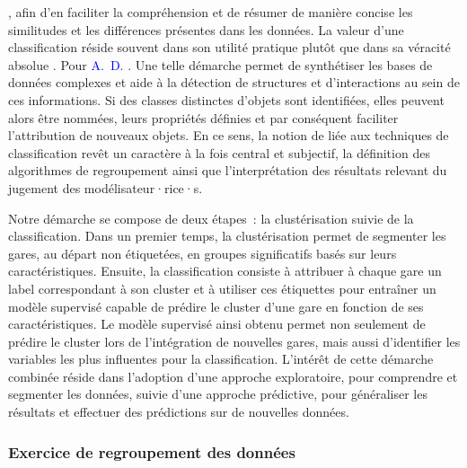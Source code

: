 \begin{refsegment}
{}, afin d'en faciliter la compréhension et de résumer de manière concise les similitudes et les différences présentes dans les données. La valeur d'une classification réside souvent dans son utilité pratique plutôt que dans sa véracité absolue \textcolor{blue}{\autocite[4]{everitt_cluster_2011}}. Pour \textcolor{blue}{A.~D.} \textcolor{blue}{\textcite[5]{gordon_classification_1999}}. Une telle démarche permet de synthétiser les bases de données complexes et aide à la détection de structures et d'interactions au sein de ces informations. Si des classes distinctes d’objets sont identifiées, elles peuvent alors être nommées, leurs propriétés définies et par conséquent faciliter l'attribution de nouveaux objets. En ce sens, la notion de  liée aux techniques de classification revêt un caractère à la fois central et subjectif, la définition des algorithmes de regroupement ainsi que l'interprétation des résultats relevant du jugement des modélisateur·rice·s.%

Notre démarche se compose de deux étapes~: la clustérisation suivie de la classification. Dans un premier temps, la clustérisation permet de segmenter les gares, au départ non étiquetées, en groupes significatifs basés sur leurs caractéristiques. Ensuite, la classification consiste à attribuer à chaque gare un label correspondant à son cluster et à utiliser ces étiquettes pour entraîner un modèle supervisé capable de prédire le cluster d'une gare en fonction de ses caractéristiques. Le modèle supervisé ainsi obtenu permet non seulement de prédire le cluster lors de l'intégration de nouvelles gares, mais aussi d'identifier les variables les plus influentes pour la classification. L'intérêt de cette démarche combinée réside dans l'adoption d'une approche exploratoire, pour comprendre et segmenter les données, suivie d'une approche prédictive, pour généraliser les résultats et effectuer des prédictions sur de nouvelles données.%

\subsubsection*{Exercice de regroupement des données
    \label{chap6:methodologie-statistiques-clusterisation}
    }


\end{refsegment}
